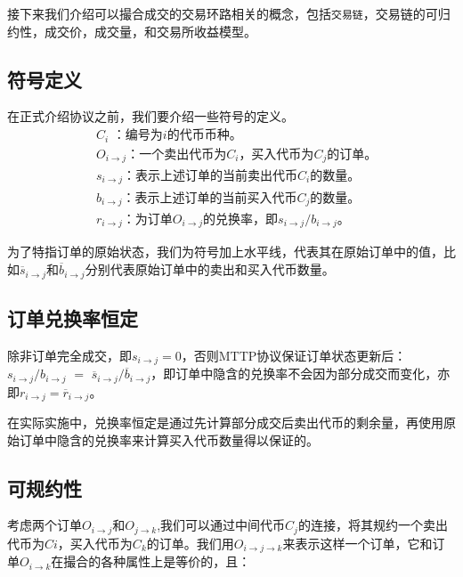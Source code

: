 \documentclass[UTF8,nofonts]{ctexart}
\begin{document}
接下来我们介绍可以撮合成交的交易环路相关的概念，包括\texttt{交易链}，交易链的可归约性，成交价，成交量，和交易所收益模型。

\subsection{符号定义}

在正式介绍协议之前，我们要介绍一些符号的定义。
\[
\begin{split}
&C_{i}\text{ ：}\text{编号为$i$的代币币种。}\\
&O_{i\rightarrow j}\text{：}\text{一个卖出代币为$C_{i}$，买入代币为$C_{j}$的订单。}\\
&s_{i\rightarrow j}\text{：}\text{表示上述订单的当前卖出代币$C_{i}$的数量。}\\
&b_{i\rightarrow j}\text{：}\text{表示上述订单的当前买入代币$C_{j}$的数量。}\\
&r_{i\rightarrow j}\text{：}\text{为订单$O_{i\rightarrow j}$的兑换率，即$s_{i\rightarrow j} / b_{i\rightarrow j}$。}
\end{split}
\]


为了特指订单的原始状态，我们为符号加上水平线，代表其在原始订单中的值，比如$\overline{s}_{i\rightarrow j}$和$\overline{b}_{i\rightarrow j}$分别代表原始订单中的卖出和买入代币数量。

\subsection{订单兑换率恒定\label{sec:consistrate}}

除非订单完全成交，即$s_{i\rightarrow j} = 0$，否则MTTP协议保证订单状态更新后：
$s_{i\rightarrow j} / b_{i\rightarrow j}$ $=$ $\overline{s}_{i\rightarrow j} / \overline{b}_{i\rightarrow j}$，即订单中隐含的兑换率不会因为部分成交而变化，亦即$r_{i\rightarrow j} = \overline{r}_{i\rightarrow j}$。

在实际实施中，兑换率恒定是通过先计算部分成交后卖出代币的剩余量，再使用原始订单中隐含的兑换率来计算买入代币数量得以保证的。

\subsection{可规约性\label{sec:reducability}}


考虑两个订单$O_{i\rightarrow j}$和$O_{j\rightarrow k}$,我们可以通过中间代币$C_j$的连接，将其规约一个卖出代币为$Ci$，买入代币为$C_k$的订单。我们用$O_{i\rightarrow j\rightarrow k}$来表示这样一个订单，它和订单$O_{i\rightarrow k}$在撮合的各种属性上是等价的，且：
\end{document}
